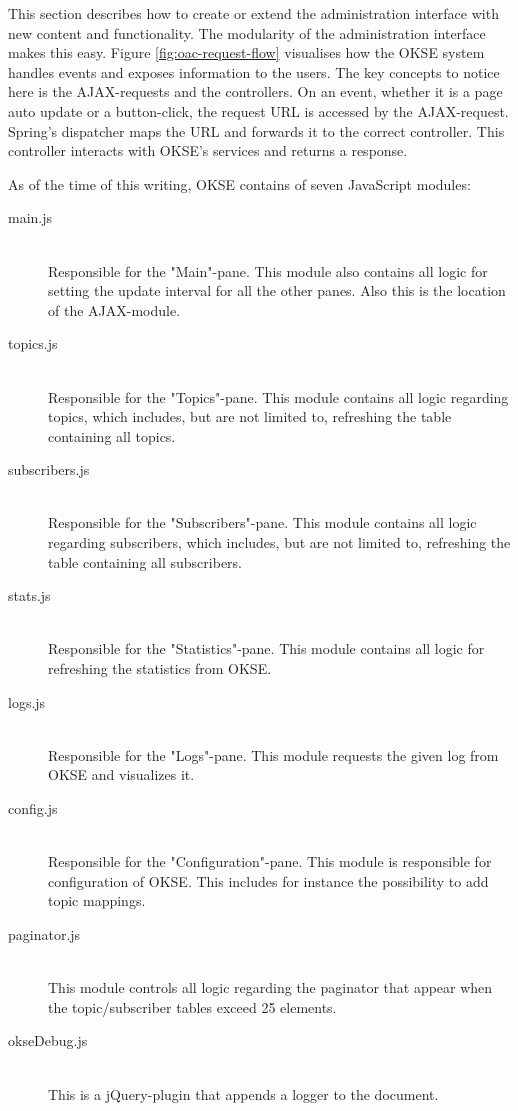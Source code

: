 This section describes how to create or extend the administration interface with new content and functionality. The modularity of the administration interface makes this easy. Figure \ref{fig:oac-request-flow} visualises how the OKSE system handles events and exposes information to the users. The key concepts to notice here is the AJAX-requests and the controllers. On an event, whether it is a page auto update or a button-click, the request URL is accessed by the AJAX-request. Spring's dispatcher maps the URL and forwards it to the correct controller. This controller interacts with OKSE's services and returns a response.

As of the time of this writing, OKSE contains of seven JavaScript modules: 

\begin{description}
    \item[main.js] \hfill \\ Responsible for the "Main"-pane. This module also contains all logic for setting the update interval for all the other panes. Also this is the location of the AJAX-module. 
    \item[topics.js] \hfill \\ Responsible for the "Topics"-pane. This module contains all logic regarding topics, which includes, but are not limited to, refreshing the table containing all topics. 
    \item[subscribers.js] \hfill \\ Responsible for the "Subscribers"-pane. This module contains all logic regarding subscribers, which includes, but are not limited to, refreshing the table containing all subscribers. 
    \item[stats.js] \hfill \\ Responsible for the "Statistics"-pane. This module contains all logic for refreshing the statistics from OKSE.
    \item[logs.js] \hfill \\ Responsible for the "Logs"-pane. This module requests the given log from OKSE and visualizes it.
    \item[config.js] \hfill \\ Responsible for the "Configuration"-pane. This module is responsible for configuration of OKSE. This includes for instance the possibility to add topic mappings. 
    \item[paginator.js] \hfill \\ This module controls all logic regarding the paginator that appear when the topic/subscriber tables exceed 25 elements. 
    \item[okseDebug.js] \hfill \\ This is a jQuery-plugin that appends a logger to the document.
\end{description}

